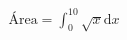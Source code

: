 \documentclass[preview]{standalone}
\begin{document}
\begin{align*}
\text{Área} = \int_{0}^{10} \sqrt{x}\mathrm{d}x
\end{align*}
\end{document}
